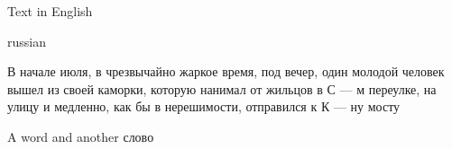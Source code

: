 \documentclass{article}
\begin{document}
Text in English

\begin{otherlanguage*}{russian}

    В начале июля, в чрезвычайно жаркое время, под вечер, один молодой человек вышел из своей каморки, 
    которую нанимал от жильцов в С — м переулке, на улицу и медленно, как бы в нерешимости, отправился к К — ну мосту
    
\end{otherlanguage*}

A word and another \foreignlanguage{russian}{слово}
\end{document}
